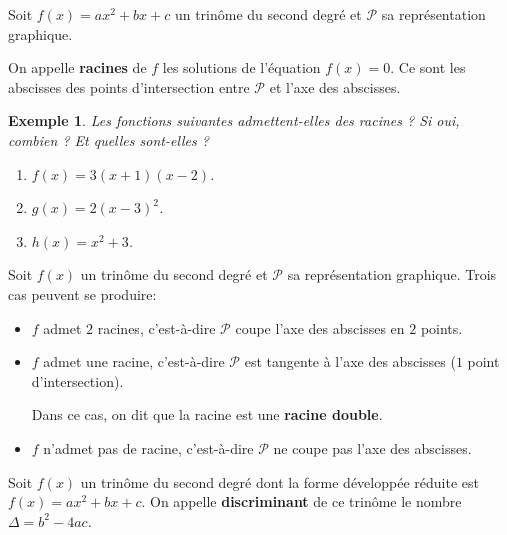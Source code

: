 \documentclass[a4paper,11pt]{article}
\theoremstyle{break}
\newcounter{enonce}
\newtheorem{exemple}[enonce]{Exemple}
\begin{document}
  
  \begin{definition}
    Soit $f(x)=ax^2+bx+c$ un trinôme du second degré et $\mathcal{P}$ sa représentation 
    graphique.
    
    On appelle \textbf{racines} de $f$ les solutions de l'équation $f(x)=0$. Ce sont les 
    abscisses des points d'intersection entre $\mathcal{P}$ et l'axe des abscisses.
    
  \end{definition}
  
  \begin{exemple}
    Les fonctions suivantes admettent-elles des racines ? Si oui, combien ? 
    Et quelles sont-elles ?
    \begin{enumerate}
     \item $f(x)=3(x+1)(x-2)$. 
     \item $g(x)=2(x-3)^2$.
     \item $h(x)=x^2+3$.
    \end{enumerate}
  \end{exemple}
  
  \begin{proposition}
   Soit $f(x)$ un trinôme du second degré et $\mathcal{P}$ sa représentation graphique.
    Trois cas peuvent se produire:
   
   \begin{itemize}
    \item $f$ admet $2$ racines, c'est-à-dire $\mathcal{P}$ coupe l'axe des abscisses 
    en $2$ points.
    \item $f$ admet une racine, c'est-à-dire $\mathcal{P}$ est tangente à l'axe
    des abscisses ($1$ point d'intersection).
    
    Dans ce cas, on dit que la racine est une \textbf{racine double}.
    
    \item $f$ n'admet pas de racine, c'est-à-dire $\mathcal{P}$ ne coupe pas l'axe des abscisses.
   \end{itemize}
   
  \end{proposition}
  
  \vspace{10cm}
  
  
  
  \begin{definition}[Discriminant]
    Soit $f(x)$ un trinôme du second degré dont la forme développée réduite
    est $f(x)=ax^2+bx+c$. On appelle \textbf{discriminant} de ce trinôme
    le nombre $\Delta=b^2-4ac$.
    
    
  \end{definition}
  
\end{document}
